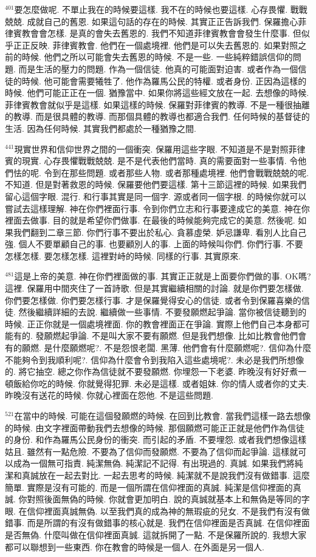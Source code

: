 \documentclass{book}
\begin{document}
$^{401}$要怎麼做呢.
不單止我在的時候要這樣.
我不在的時候也要這樣.
心存畏懼.
戰戰兢兢.
成就自己的舊恩.
如果這句話的存在的時候.
其實正正告訴我們.
保羅擔心菲律賓教會會怎樣.
是真的會失去舊恩的.
我們不知道菲律賓教會會發生什麼事.
但似乎正正反映.
菲律賓教會.
他們在一個處境裡.
他們是可以失去舊恩的.
如果對照之前的時候.
他們之所以可能會失去舊恩的時候.
不是一些.
一些純粹錯誤信仰的問題.
而是生活的壓力的問題.
作為一個信徒.
他真的可能面對迫害.
或者作為一個信徒的時候.
他可能會需要犧牲了.
他作為羅馬公民的特權.
或者身份.
正因為這樣的時候.
他們可能正正在一個.
猶豫當中.
如果你將這些經文放在一起.
去想像的時候.
菲律賓教會就似乎是這樣.
如果這樣的時候.
保羅對菲律賓的教導.
不是一種很抽離的教導.
而是很具體的教導.
而那個具體的教導也都適合我們.
任何時候的基督徒的生活.
因為任何時候.
其實我們都處於一種猶豫之間.

$^{441}$現實世界和信仰世界之間的一個衝突.
保羅用這些字眼.
不知道是不是對照菲律賓的現實.
心存畏懼戰戰兢兢.
是不是代表他們當時.
真的需要面對一些事情.
令他們怯的呢.
令到在那些問題.
或者那些人物.
或者那種處境裡.
他們會戰戰兢兢的呢.
不知道.
但是對著救恩的時候.
保羅要他們要這樣.
第十三節這裡的時候.
如果我們留心這個字眼.
混行.
和行事其實是同一個字.
源或者同一個字根.
的時候你就可以嘗試去這樣理解.
神在你們裡面行事.
令到你們立志和行事要達成它的美意.
神在你裡面去做事.
目的就是希望你們做事.
在最後的時候能夠完成它的美意.
然後呢.
如果我們翻到二章三節.
你們行事不要出於私心.
貪慕虛榮.
妒忌謙卑.
看別人比自己強.
個人不要單顧自己的事.
也要顧別人的事.
上面的時候叫你們.
你們行事.
不要怎樣怎樣.
要怎樣怎樣.
這裡對峙的時候.
同樣的行事.
其實原來.

$^{481}$這是上帝的美意.
神在你們裡面做的事.
其實正正就是上面要你們做的事.
OK嗎?這裡.
保羅用中間夾住了一首詩歌.
但是其實繼續相關的討論.
就是你們要怎樣做.
你們要怎樣做.
你們要怎樣行事.
才是保羅覺得安心的信徒.
或者令到保羅喜樂的信徒.
然後繼續詳細的去說.
繼續做一些事情.
不要發願燃起爭論.
當你被信徒聽到的時候.
正正你就是一個處境裡面.
你的教會裡面正在爭論.
實際上他們自己本身都可能有的.
發願燃起爭論.
不是叫大家不要有願燃.
但是我們想像.
比如比教會他們會有的願燃.
是什麼願燃呢?.
不是怨恨老闆.
黑薄.
他們會有什麼願燃呢?.
信仰為什麼不能夠令到我順利呢?.
信仰為什麼會令到我陷入這些處境呢?.
未必是我們所想像的.
將它抽空.
總之你作為信徒就不要發願燃.
你埋怨一下老婆.
昨晚沒有好好煮一頓飯給你吃的時候.
你就覺得犯罪.
未必是這樣.
或者姐妹.
你的情人或者你的丈夫.
昨晚沒有送花的時候.
你就心裡面在怨他.
不是這些問題.

$^{521}$在當中的時候.
可能在這個發願燃的時候.
在回到比教會.
當我們這樣一路去想像的時候.
由文字裡面帶動我們去想像的時候.
那個願燃可能正正就是他們作為信徒的身份.
和作為羅馬公民身份的衝突.
而引起的矛盾.
不要埋怨.
或者我們想像這樣姑且.
雖然有一點危險.
不要為了信仰而發願燃.
不要為了信仰而起爭論.
這樣就可以成為一個無可指責.
純潔無偽.
純潔記不記得.
有出現過的.
真誠.
如果我們將純潔和真誠放在一起去對比.
一起去思考的時候.
純潔就不是說我們沒有做錯事.
這麼簡單.
實際是沒有可能的.
而是一個所謂在信仰裡面的真誠.
純潔是信仰裡面的真誠.
你對照後面無偽的時候.
你就會更加明白.
說的真誠就基本上和無偽是等同的字眼.
在信仰裡面真誠無偽.
以至我們真的成為神的無瑕疵的兒女.
不是我們有沒有做錯事.
而是所謂的有沒有做錯事的核心就是.
我們在信仰裡面是否真誠.
在信仰裡面是否無偽.
什麼叫做在信仰裡面真誠.
這就拆開了一點.
不是保羅所說的.
我想大家都可以聯想到一些東西.
你在教會的時候是一個人.
在外面是另一個人.
\end{document}
